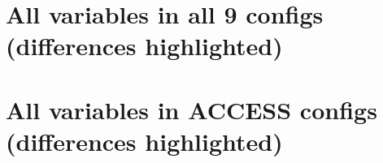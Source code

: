 \documentclass[10pt]{article}
\newcommand{\nmldiffer}[1]{#1} %
\newcommand{\doscript}[1]{{\footnotesize\textsf{}}}
\begin{document}
\newpage
\section{All variables in all 9 configs (differences highlighted)}
\renewcommand{\nmldiffer}[1]{\colorbox{hilite}{#1}}\setlength{\fboxsep}{0pt} %
\doscript{/Users/andy/anaconda/bin/python3 /Users/andy/bin/nmltab.py --format latex original/GFDL_ESM2M_input-cut.nml original/MOM_SIS_TOPAZ_input.nml original/fabio_momsis1_input.nml original/paul_momsis025_input.nml original/fanghua_momsis01v5KDS75_WOA13_input.nml original/russ-accessom-mom4p1-input.nml new_accessom2_1deg_jra55_ryf_input.nml new_accessom2_025deg_jra55_ryf_input.nml new_accessom2_01deg_jra55_ryf_input.nml}

\newpage
\section{All variables in ACCESS configs (differences highlighted)}
\renewcommand{\nmldiffer}[1]{\colorbox{hilite}{#1}}\setlength{\fboxsep}{0pt} %
\doscript{/Users/andy/anaconda/bin/python3 /Users/andy/bin/nmltab.py --format latex original/kiss_accessom2_025deg_jra55_ryf_logfile.000000.out original/russ-accessom-mom4p1-input.nml new_accessom2_1deg_jra55_ryf_input.nml new_accessom2_025deg_jra55_ryf_input.nml new_accessom2_01deg_jra55_ryf_input.nml}


\end{document}
